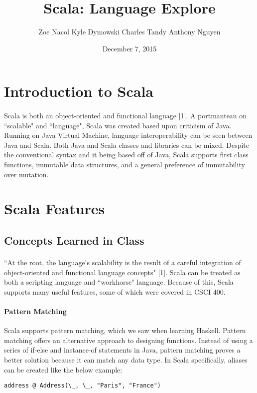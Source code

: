 \documentclass[12pt]{article}
\begin{document}
\title{Scala: Language Explore \vspace{-2ex}}
\date{\footnotesize December 7, 2015\vspace{-2ex}}
\author{\footnotesize Zoe Nacol \qquad Kyle Dymowski \qquad Charles Tandy \qquad Anthony Nguyen \vspace{-2ex}}
\maketitle

\section{Introduction to Scala}
	\paragraph{}Scala is both an object-oriented and functional language [1]. A portmanteau on ``scalable" and ``language", Scala was created based upon criticism of Java. Running on Java Virtual Machine, language interoperability can be seen between Java and Scala. Both Java and Scala classes and libraries can be mixed. Despite the conventional syntax and it being based off of Java, Scala supports first class functions, immutable data structures, and a general preference of immutability over mutation.
\section{Scala Features}
	\subsection{Concepts Learned in Class}
		\paragraph{}``At the root, the language's scalability is the result of a careful integration of object-oriented and functional language concepts" [1]. Scala can be treated as both a scripting language and ``workhorse" language. Because of this, Scala supports many useful features, some of which were covered in CSCI 400.
		\paragraph{Pattern Matching}Scala supports pattern matching, which we saw when learning Haskell. Pattern matching offers an alternative approach to designing functions. Instead of using a series of if-else and instance-of statements in Java, pattern matching proves a better solution because it can match any data type. In Scala specifically, aliases can be created like the below example:
		\begin{lstlisting}[xleftmargin=.2\textwidth]
			address @ Address(\_, \_, "Paris", "France")
		\end{lstlisting}
\end{document}
